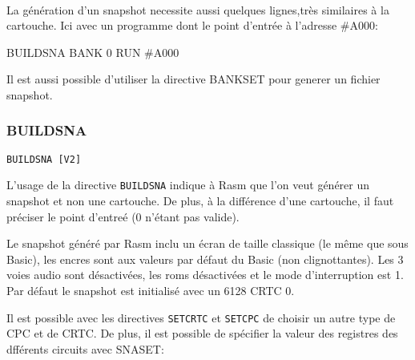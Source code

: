 \paragraph{}

\begin{xfr}
La génération d'un snapshot necessite aussi quelques lignes,très similaires à la cartouche. Ici avec un programme dont le point d'entrée à l'adresse \#A000:
\end{xfr}

\begin{xen}
\end{xen}

\begin{code}
BUILDSNA
BANK 0
RUN \#A000
\end{code}

\begin{xfr}
Il est aussi possible d'utiliser la directive BANKSET pour generer un fichier snapshot.
\end{xfr}

\subsubsection{BUILDSNA}
\begin{verbatim}
BUILDSNA [V2]
\end{verbatim}

\begin{xfr}
L'usage de la directive \texttt{BUILDSNA} indique à Rasm que l'on veut générer un snapshot et non une cartouche.  De plus, à la différence d'une cartouche, il faut préciser le point d'entreé (0 n'étant pas valide).

Le snapshot généré par Rasm inclu un écran de taille classique (le même que sous Basic), les encres sont aux valeurs par défaut du Basic (non clignottantes). Les 3 voies audio sont désactivées, les roms désactivées et le mode d'interruption est 1.
Par défaut le snapshot est initialisé avec un 6128 CRTC 0.

Il est possible avec les directives \texttt{SETCRTC} et \texttt{SETCPC} de choisir un autre type de CPC et de CRTC.
De plus, il est possible de spécifier la valeur des registres des dfférents circuits avec SNASET:
\end{xfr}

